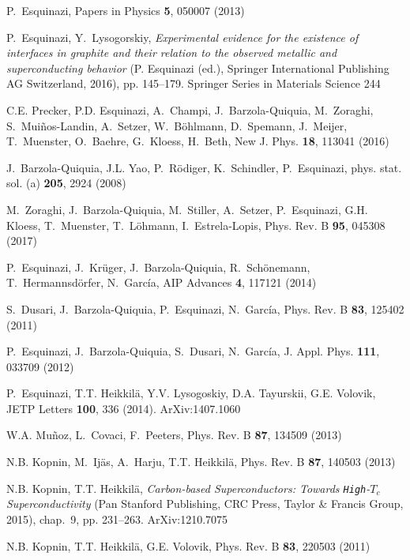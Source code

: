 \documentclass[aps,dvipsnames,twocolumn,floatfix,amsmath]{revtex4-1}
\begin{document}
\begin{thebibliography}{10}
P.~Esquinazi, Papers in Physics \textbf{5}, 050007 (2013)

P.~Esquinazi, Y.~Lysogorskiy, \emph{Experimental evidence for the
existence of
  interfaces in graphite and their relation to the observed metallic and
  superconducting behavior} (P. Esquinazi (ed.), Springer International
  Publishing AG Switzerland, 2016), pp. 145--179.
\newblock Springer Series in Materials Science 244

C.E. Precker, P.D. Esquinazi, A.~Champi, J.~Barzola-Quiquia,
M.~Zoraghi,
  S.~Mui{\~n}os-Landin, A.~Setzer, W.~B{\"o}hlmann, D.~Spemann, J.~Meijer,
  T.~Muenster, O.~Baehre, G.~Kloess, H.~Beth, New J. Phys. \textbf{18}, 113041
  (2016)

J.~Barzola-Quiquia, J.L. Yao, P.~R\"odiger, K.~Schindler,
P.~Esquinazi, phys.
  stat. sol. (a) \textbf{205}, 2924 (2008)

M.~Zoraghi, J.~Barzola-Quiquia, M.~Stiller, A.~Setzer,
P.~Esquinazi, G.H.
  Kloess, T.~Muenster, T.~L\"ohmann, I.~Estrela-Lopis, Phys. Rev. B
  \textbf{95}, 045308 (2017)

P.~Esquinazi, J.~Kr\"uger, J.~Barzola-Quiquia, R.~Sch\"onemann,
  T.~Hermannsd\"orfer, N.~Garc\'ia, AIP Advances \textbf{4}, 117121 (2014)

S.~Dusari, J.~Barzola-Quiquia, P.~Esquinazi, N.~Garc\'ia, Phys.
Rev. B
  \textbf{83}, 125402 (2011)

P.~Esquinazi, J.~Barzola-Quiquia, S.~Dusari, N.~Garc\'ia, J. Appl.
Phys.
  \textbf{111}, 033709 (2012)

P.~Esquinazi, T.T. Heikkil\"a, Y.V. Lysogoskiy, D.A. Tayurskii,
G.E. Volovik,
  JETP Letters \textbf{100}, 336 (2014).
\newblock ArXiv:1407.1060

W.A. Mu{\~n}oz, L.~Covaci, F.~Peeters, Phys. Rev. B \textbf{87},
134509 (2013)

N.B. Kopnin, M.~Ij\"as, A.~Harju, T.T. Heikkil\"a, Phys. Rev. B
\textbf{87},
  140503 (2013)

N.B. Kopnin, T.T. Heikkil\"a, \emph{Carbon-based Superconductors:
Towards
  \texttt{High}-$T_c$ Superconductivity} (Pan Stanford Publishing, CRC Press,
  Taylor \& Francis Group, 2015), chap.~9, pp. 231--263.
\newblock ArXiv:1210.7075

N.B. Kopnin, T.T. Heikkil\"a, G.E. Volovik, Phys. Rev. B
\textbf{83}, 220503
  (2011)


\end{thebibliography}
\end{document}
